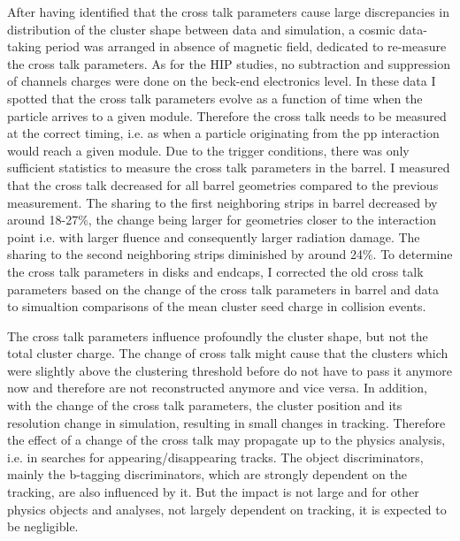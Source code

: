 After having identified that the cross talk parameters cause large discrepancies in distribution of the cluster shape between data and simulation, a cosmic data-taking period was arranged in absence of  magnetic field, dedicated to re-measure the cross talk parameters. As for the HIP studies, no subtraction and suppression of channels charges were done on the beck-end electronics level. In these data I spotted that the cross talk parameters evolve as a function of time when the particle arrives to a given module. Therefore the cross talk needs to be measured at the correct timing, i.e. as when a particle originating from the pp interaction would reach a given module. Due to the trigger conditions, there was only sufficient statistics to measure the cross talk parameters in the barrel. I measured that the cross talk decreased for all barrel geometries compared to the previous measurement. The sharing to the first neighboring strips in barrel decreased by around 18-27\%, the change being larger for geometries closer to the interaction point i.e. with larger fluence and consequently larger radiation damage. The sharing to the second neighboring strips diminished by around 24\%. To determine the cross talk parameters in disks and endcaps, I corrected the old cross talk parameters based on the change of the cross talk parameters in barrel and data to simualtion comparisons of the mean cluster seed charge in collision events. 



The cross talk parameters influence profoundly the cluster shape, but not the total cluster charge. The change of cross talk might cause that the clusters which were slightly above the clustering threshold before do not have to pass it anymore now and therefore are not reconstructed anymore and vice versa. In addition, with the change of the cross talk parameters, the cluster position and its resolution change in simulation, resulting in small changes in tracking. Therefore the effect of a change of the cross talk may propagate up to the physics analysis, i.e. in searches for appearing/disappearing tracks. The object discriminators, mainly the b-tagging discriminators, which are strongly dependent on the tracking, are also influenced by it. But the impact is not large and for other physics objects and analyses, not largely dependent on tracking, it is expected to be negligible.

